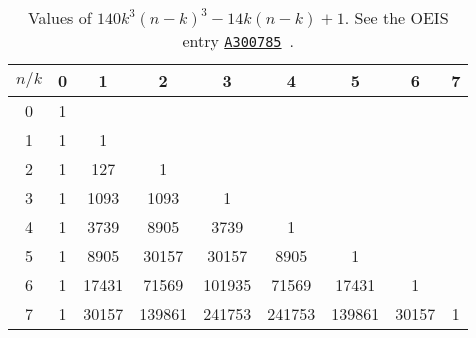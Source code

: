 \begin{table}[H]
    \setlength\extrarowheight{-6pt}
    \begin{tabular}{c|cccccccc}
        $n/k$ & 0 & 1     & 2      & 3      & 4      & 5      & 6     & 7 \\
        \hline
        0     & 1 &       &        &        &        &        &       &   \\
        1     & 1 & 1     &        &        &        &        &       &   \\
        2     & 1 & 127   & 1      &        &        &        &       &   \\
        3     & 1 & 1093  & 1093   & 1      &        &        &       &   \\
        4     & 1 & 3739  & 8905   & 3739   & 1      &        &       &   \\
        5     & 1 & 8905  & 30157  & 30157  & 8905   & 1      &       &   \\
        6     & 1 & 17431 & 71569  & 101935 & 71569  & 17431  & 1     &   \\
        7     & 1 & 30157 & 139861 & 241753 & 241753 & 139861 & 30157 & 1
    \end{tabular}
    \caption{Values of $140 k^3 (n-k)^3 - 14k(n-k) + 1$.
    See the OEIS entry \href{https://oeis.org/A300785}{\texttt{A300785}}~\cite{oeis_numerical_triangle_row_sums_give_seventh_powers}.}
    \label{tab:row-sums-gives-seventh-power}
\end{table}
